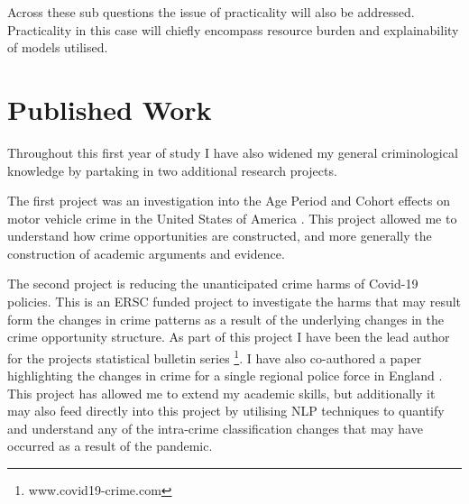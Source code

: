 Across these sub questions the issue of practicality will also be addressed. Practicality in this case will chiefly encompass resource burden and explainability of models utilised.

\section{Published Work} Throughout this first year of study I have also widened my general criminological knowledge by partaking in two additional research projects. 

The first project was an investigation into the Age Period and Cohort effects on motor vehicle crime in the United States of America \parencite{dixon2020age}. This project allowed me to understand how crime opportunities are constructed, and more generally the construction of academic arguments and evidence.

The second project is reducing the unanticipated crime harms of Covid-19 policies.  This is an ERSC funded project to investigate the harms that may result form the changes in crime patterns as a result of the underlying changes in the crime opportunity structure. As part of this project I have been the lead author for the projects statistical bulletin series \footnote{www.covid19-crime.com}. I have also co-authored a paper highlighting the changes in crime for a single regional police force in England \parencite{halford2020crime}. This project has allowed me to extend my academic skills, but additionally it may also feed directly into this project by utilising NLP techniques to quantify and understand any of the intra-crime classification changes that may have occurred as a result of the pandemic.
